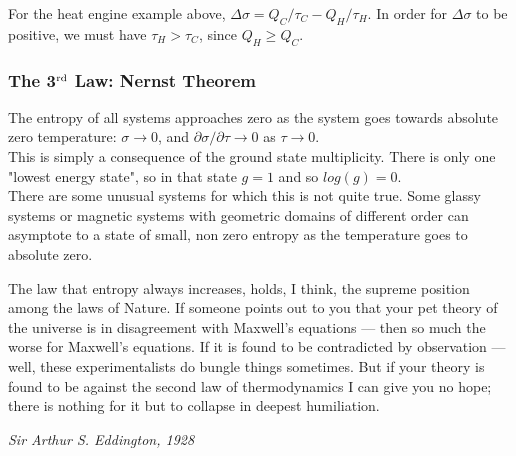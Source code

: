 For the heat engine example above, $\Delta \sigma = Q_C/\tau_C - Q_H/\tau_H$.
In order for $\Delta \sigma$ to be positive, we must have $\tau_H > \tau_C$,
since $Q_H \ge Q_C$.



\subsubsection{The 3$^{\rm rd}$ Law: Nernst Theorem}
The entropy of all systems approaches zero as the system goes towards
absolute zero temperature: $\sigma \rightarrow 0$, and $\partial \sigma /\partial \tau \rightarrow 0$ as $\tau \rightarrow 0$. \\

This is simply a consequence of the ground state multiplicity. There is only
one "lowest energy state", so in that state $g = 1$ and so 
$log(g) = 0$. \\

There are some unusual systems for which this is not quite true.
Some glassy systems or magnetic systems with geometric domains of different
order can asymptote to a state of small, non zero entropy as the temperature
goes to absolute zero.



\epigraph{The law that entropy always increases, holds, I think, the supreme position among the laws of Nature. If someone points out to you that your pet theory of the universe is in disagreement with Maxwell's equations --- then so much the worse for Maxwell's equations. If it is found to be contradicted by observation --- well, these experimentalists do bungle things sometimes. But if your theory is found to be against the second law of thermodynamics I can give you no hope; there is nothing for it but to collapse in deepest humiliation.}
{\textit{Sir Arthur S. Eddington, 1928}}

